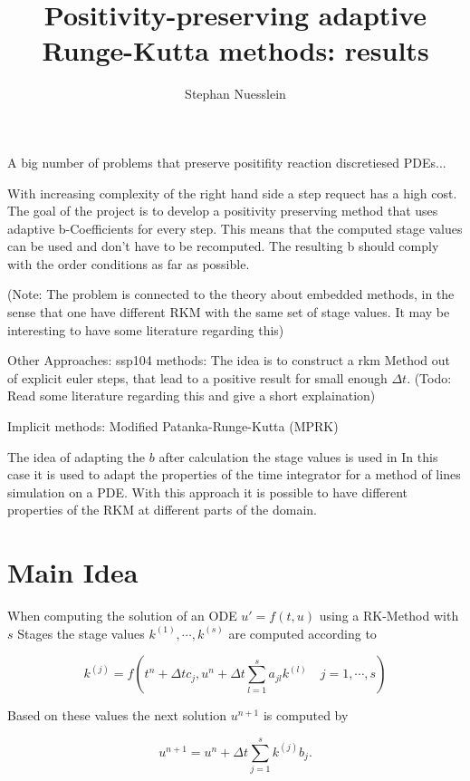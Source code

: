 \documentclass{article}
\title{Positivity-preserving adaptive Runge-Kutta methods: results}
\author{Stephan Nuesslein}
\begin{document}
\maketitle


A big number of problems that preserve positifity reaction discretiesed PDEs...

With increasing complexity of the right hand side a step requect has a high cost. 
The goal of the project is to develop a positivity preserving method that uses adaptive b-Coefficients for every step.  This means that the computed stage values can be used and don't have to be recomputed. 
The resulting b should comply with the order conditions as far as possible.



(Note: The problem is connected to the theory about embedded methods, in the sense that one have different RKM with the same set of stage values. It may be interesting to have some literature regarding this)

Other Approaches: 
ssp104 methods: The idea is to construct a rkm Method out of explicit euler steps, that lead to a positive result for small enough $\Delta t$. (Todo: Read some literature regarding this and give a short explaination)

Implicit methods: Modified Patanka-Runge-Kutta (MPRK) \cite{kopecz_comparison_2019}

The idea of adapting the $b$ after calculation the stage values is used in \cite{ketcheson_spatially_2013}
In this case it is used to adapt the properties of the time integrator for a method of lines simulation on a PDE. With this approach it is possible to have different properties of the RKM at different parts of the domain. 


\section{Main Idea}

When computing the solution of an ODE $u ' = f(t,u) $ using a RK-Method with $s$ Stages the stage values $k^{(1)},\cdots,k^{(s)}$ are computed according to

\begin{equation}
k^{(j)} =  f(t^n + \Delta t c_j, u^n + \Delta t \sum_{l = 1}^{s} a_{jl} k^{(l)}  \quad j = 1,\cdots,s)
\end{equation}

Based on these values the next solution $u^{n+1}$ is computed by

\begin{equation}
u^{n+1} = u^n + \Delta t \sum_{j  = 1}^s k^{(j)} b_j .
\end{equation}
\end{document}
